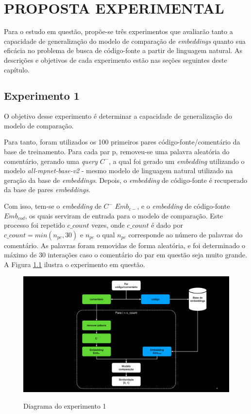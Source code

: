 \chapter{PROPOSTA EXPERIMENTAL}
\label{chp:experiments}

Para o estudo em questão, propõe-se três experimentos que avaliarão tanto a capacidade de generalização do modelo de comparação de \textit{embeddings} quanto sua eficácia no problema de busca de código-fonte a partir de linguagem natural. As descrições e objetivos de cada experimento estão nas seções seguintes deste capítulo.

\section{Experimento 1}
\label{sec:experiments:experiment-1}
O objetivo desse experimento é determinar a capacidade de generalização do modelo de comparação.

Para tanto, foram utilizados os 100 primeiros pares código-fonte/comentário da base de treinamento. Para cada par p, removeu-se uma palavra aleatória do comentário, gerando uma \textit{query} $C^-$, a qual foi gerado um \textit{embedding} utilizando o modelo \textit{all-mpnet-base-v2} - mesmo modelo de linguagem natural utilizado na geração da base de \textit{embeddings}. Depois, o \textit{embedding} de código-fonte é recuperado da base de pares \textit{embeddings}. 

Com isso, tem-se o \textit{embedding} de $C^-$ $Emb_{c-}$, e o \textit{embedding} de código-fonte $Emb_{cod}$, os quais serviram de entrada para o modelo de comparação. Este processo foi repetido $c\_count$ vezes, onde $c\_count$ é dado por $c\_count = min(n_{pc}, 30)$ e $n_{pc}$ o qual $n_{pc}$ corresponde ao número de palavras do comentário. As palavras foram removidas de forma aleatória, e foi determinado o máximo de 30 interações caso o comentário do par em questão seja muito grande. A Figura \ref{fig:experiment-1-diagram} ilustra o experimento em questão.

\begin{figure}[H]
    \centering
        \caption{Diagrama do experimento 1}
        \includegraphics[scale=0.3]{imagens/proposta-experimental/experiment-1.pdf}
        \label{fig:experiment-1-diagram}
\end{figure}

